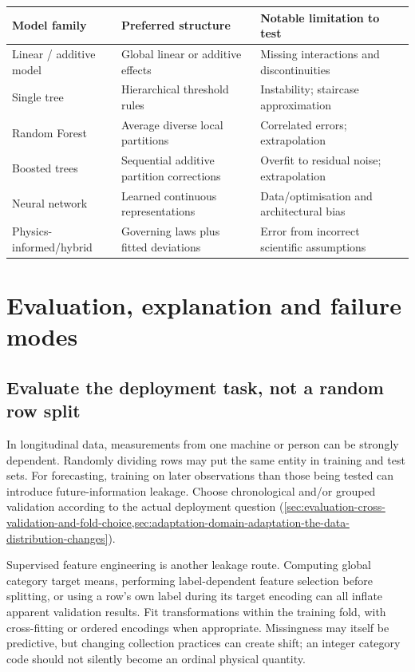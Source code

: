 \begin{center}\small
\begin{tabularx}{\linewidth}{@{}L{.22\linewidth}YY@{}}\toprule
Model family & Preferred structure & Notable limitation to test\\\midrule
Linear / additive model & Global linear or additive effects & Missing interactions and discontinuities\\
Single tree & Hierarchical threshold rules & Instability; staircase approximation\\
Random Forest & Average diverse local partitions & Correlated errors; extrapolation\\
Boosted trees & Sequential additive partition corrections & Overfit to residual noise; extrapolation\\
Neural network & Learned continuous representations & Data/optimisation and architectural bias\\
Physics-informed/hybrid & Governing laws plus fitted deviations & Error from incorrect scientific assumptions\\\bottomrule
\end{tabularx}
\end{center}

\section{Evaluation, explanation and failure modes}
\label{sec:trees-evaluation-explanation-and-failure-modes}
\subsection{Evaluate the deployment task, not a random row split}
\label{subsec:trees-evaluate-the-deployment-task-not-a-random-row-split}
In longitudinal data, measurements from one machine or person can be strongly dependent.
Randomly dividing rows may put the same entity in training and test sets.
For forecasting, training on later observations than those being tested can introduce future-information leakage.
Choose chronological and/or grouped validation according to the actual deployment question (\cref{sec:evaluation-cross-validation-and-fold-choice,sec:adaptation-domain-adaptation-the-data-distribution-changes}).

Supervised feature engineering is another leakage route.
Computing global category target means, performing label-dependent feature selection before splitting, or using a row's own label during its target encoding can all inflate apparent validation results.
Fit transformations within the training fold, with cross-fitting or ordered encodings when appropriate.
Missingness may itself be predictive, but changing collection practices can create shift; an integer category code should not silently become an ordinal physical quantity.

